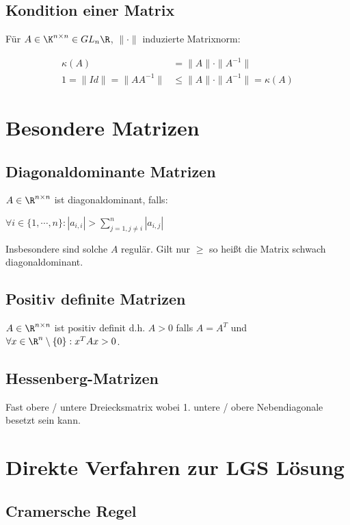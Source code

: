 \subsection*{Kondition einer Matrix}

Für $A \in \K^{n \times n} \in GL_n{\R}$, $\|\cdot\|$ induzierte Matrixnorm:

\vspace*{-4mm}
\begin{align*}
\kappa(A) &= \|A\| \cdot \|A^{-1}\| \\
1 = \|Id\| = \|AA^{-1}\| &\leq \|A\| \cdot \|A^{-1}\| = \kappa(A)
\end{align*}

\section*{Besondere Matrizen}

\subsection*{Diagonaldominante Matrizen}

$A \in \R^{n \times n}$ ist diagonaldominant, falls:

$\forall i \in \{1,\cdots,n\} : |a_{i,i}| > \sum_{j=1,j\neq i}^n |a_{i,j}|$

Insbesondere sind solche $A$ regulär. Gilt nur $\geq$ so heißt die Matrix schwach diagonaldominant.

\subsection*{Positiv definite Matrizen}

$A \in \R^{n \times n}$ ist positiv definit d.h. $A > 0$ falls $A=A^T$ und $\forall x \in \R^n \setminus \{0\} : x^TAx > 0$.

\subsection*{Hessenberg-Matrizen}

Fast obere / untere Dreiecksmatrix wobei 1. untere / obere Nebendiagonale besetzt sein kann.

\section*{Direkte Verfahren zur LGS Lösung}

\subsection*{Cramersche Regel}

